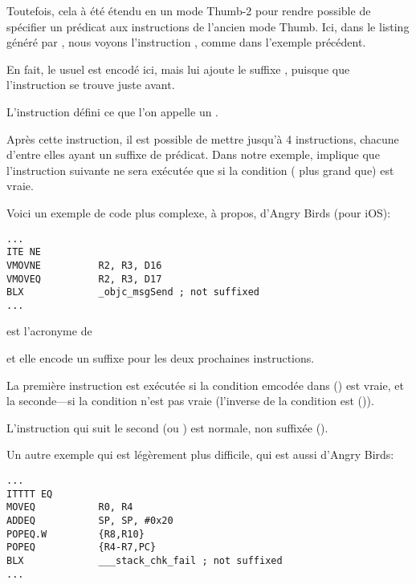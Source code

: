 
Toutefois, cela à été étendu en un mode Thumb-2 pour rendre possible de spécifier
un prédicat aux instructions de l'ancien mode Thumb.
Ici, dans le listing généré par \IDA, nous voyons l'instruction , comme
dans l'exemple précédent.

En fait, le  usuel est encodé ici, mais \IDA lui ajoute le suffixe ,
puisque que l'instruction  se trouve juste avant.

\label{ARM_Thumb_IT}
L'instruction  défini ce que l'on appelle un .

Après cette instruction, il est possible de mettre jusqu'à 4 instructions, chacune
d'entre elles ayant un suffixe de prédicat.
Dans notre exemple,  implique que l'instruction suivante ne sera exécutée
que si la condition  ( plus grand que) est vraie.

Voici un exemple de code plus complexe, à propos, d'Angry Birds (pour iOS):

\begin{lstlisting}[caption=Angry Birds Classic,style=customasmARM]
...
ITE NE
VMOVNE          R2, R3, D16
VMOVEQ          R2, R3, D17
BLX             _objc_msgSend ; not suffixed
...
\end{lstlisting}

 est l'acronyme de 

et elle encode un suffixe pour les deux prochaines instructions.

La première instruction est exécutée si la condition emcodée dans  ()
est vraie, et la seconde---si la condition n'est pas vraie (l'inverse de la condition
 est  ()).

L'instruction qui suit le second  (ou ) est normale, non suffixée
().

Un autre exemple qui est légèrement plus difficile, qui est aussi d'Angry Birds:

\begin{lstlisting}[caption=Angry Birds Classic,style=customasmARM]
...
ITTTT EQ
MOVEQ           R0, R4
ADDEQ           SP, SP, #0x20
POPEQ.W         {R8,R10}
POPEQ           {R4-R7,PC}
BLX             ___stack_chk_fail ; not suffixed
...
\end{lstlisting}

